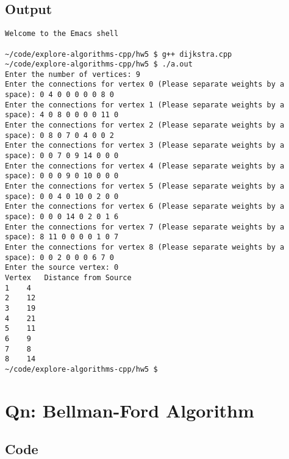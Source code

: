 \documentclass{article}
\begin{document}
\subsection{Output}

\begin{verbatim}
Welcome to the Emacs shell

~/code/explore-algorithms-cpp/hw5 $ g++ dijkstra.cpp 
~/code/explore-algorithms-cpp/hw5 $ ./a.out 
Enter the number of vertices: 9
Enter the connections for vertex 0 (Please separate weights by a space): 0 4 0 0 0 0 0 8 0
Enter the connections for vertex 1 (Please separate weights by a space): 4 0 8 0 0 0 0 11 0
Enter the connections for vertex 2 (Please separate weights by a space): 0 8 0 7 0 4 0 0 2
Enter the connections for vertex 3 (Please separate weights by a space): 0 0 7 0 9 14 0 0 0 
Enter the connections for vertex 4 (Please separate weights by a space): 0 0 0 9 0 10 0 0 0 
Enter the connections for vertex 5 (Please separate weights by a space): 0 0 4 0 10 0 2 0 0 
Enter the connections for vertex 6 (Please separate weights by a space): 0 0 0 14 0 2 0 1 6 
Enter the connections for vertex 7 (Please separate weights by a space): 8 11 0 0 0 0 1 0 7 
Enter the connections for vertex 8 (Please separate weights by a space): 0 0 2 0 0 0 6 7 0
Enter the source vertex: 0
Vertex 	 Distance from Source
1 	 4
2 	 12
3 	 19
4 	 21
5 	 11
6 	 9
7 	 8
8 	 14
~/code/explore-algorithms-cpp/hw5 $   
\end{verbatim}  

\pagebreak

\section{Qn: Bellman-Ford Algorithm}
\subsection{Code}
\end{document}
